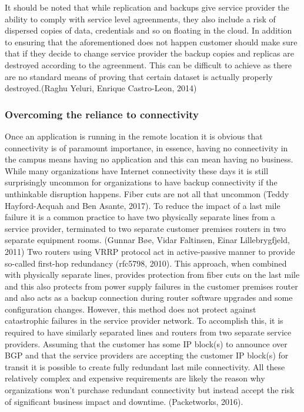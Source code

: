 \documentclass{article}
\begin{document}
\par
It should be noted that while replication and backups give service provider the ability to comply with service level agreenments, they also include a risk of dispersed copies of data, credentials and so on floating in the cloud. In addition to ensuring that the aforementioned does not happen customer should make sure that if they decide to change service provider the backup copies and replicas are destroyed according to the agreenment. This can be difficult to achieve as there are no standard means of proving that certain dataset is actually properly destroyed.(Raghu Yeluri, Enrique Castro-Leon, 2014)
\subsubsection{Overcoming the reliance to connectivity}
Once an application is running in the remote location it is obvious that connectivity is of paramount importance, in essence, having no connectivity in the campus means having no application and this can mean having no business. While many organizations have Internet connectivity these days it is still surprisingly uncommon for organizations to have backup connectivity if the unthinkable disruption happens. Fiber cuts are not all that uncommon (Teddy Hayford-Acquah and Ben Asante, 2017).
To reduce the impact of a last mile failure it is a common practice to have two physically separate lines from a service provider, terminated to two separate customer premises routers in two separate equipment rooms. (Gunnar Bøe, Vidar Faltinsen, Einar Lillebrygfjeld, 2011) Two routers using VRRP protocol act in active-passive manner to provide so-called first-hop redundancy (rfc5798, 2010). This approach, when combined with physically separate lines, provides protection from fiber cuts on the last mile and this also protects from power supply failures in the customer premises router and also acts as a backup connection during router software upgrades and some configuration changes.
However, this method does not protect against catastrophic failures in the service provider network. To accomplish this, it is required to have similarly separated lines and routers from two separate service providers. Assuming that the customer has some IP block(s) to announce over BGP and that the service providers are accepting the customer IP block(s) for transit it is possible to create fully redundant last mile connectivity. All these relatively complex and expensive requirements are likely the reason why organizations won't purchase redundant connectivity but instead accept the risk of significant business impact and downtime. (Packetworks, 2016).
\end{document}
